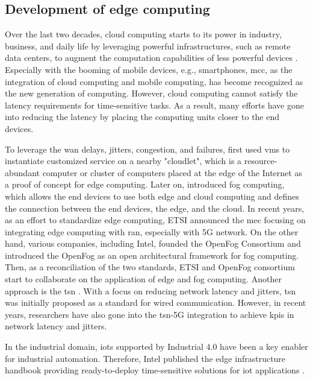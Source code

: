 \subsection{Development of edge computing}

Over the last two decades, cloud computing starts to its power in industry, business, and daily life by leveraging powerful infrastructures, such as remote data centers, to augment the computation capabilities of less powerful devices \cite{Lin2019}. Especially with the booming of mobile devices, e.g., smartphones, \gls{mcc}, as the integration of cloud computing and mobile computing, has become recognized as the new generation of computing. However, cloud computing cannot satisfy the latency requirements for time-sensitive tasks. As a result, many efforts have gone into reducing the latency by placing the computing units closer to the end devices. 

To leverage the \gls{wan} delays, jitters, congestion, and failures, \citeauthor*{Satyanarayanan2009} \cite{Satyanarayanan2009} first used \glspl{vm} to instantiate customized service on a nearby "cloudlet", which is a resource-abundant computer or cluster of computers placed at the edge of the Internet as a proof of concept for edge computing. Later on, \citeauthor*{Bonomi2012} \cite{Bonomi2012} introduced fog computing, which allows the end devices to use both edge and cloud computing and defines the connection between the end devices, the edge, and the cloud. In recent years, as an effort to standardize edge computing, ETSI \cite{Kekki2018} announced the \gls{mec} focusing on integrating edge computing with \gls{ran}, especially with 5G network. On the other hand, various companies, including Intel, founded the OpenFog Consortium and introduced the OpenFog as an open architectural framework for fog computing. Then, as a reconciliation of the two standards, ETSI and OpenFog consortium start to collaborate on the application of edge and fog computing. Another approach is the \gls{tsn} \cite{Satka2023}. With a focus on reducing network latency and jitters, \gls{tsn} was initially proposed as a standard for wired communication. However, in recent years, researchers have also gone into the \gls{tsn}-5G integration to achieve \glspl{kpi} in network latency and jitters. 

In the industrial domain, \glspl{iot} supported by Industrial 4.0 have been a key enabler for industrial automation. Therefore, Intel published the edge infrastructure handbook providing ready-to-deploy time-sensitive solutions for \gls{iot} applications \cite{intel-edge-2021}. 

